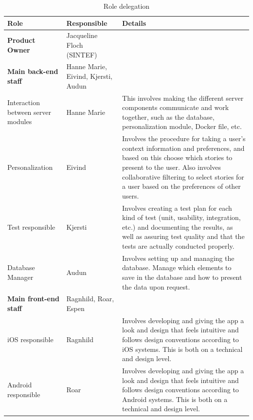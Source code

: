 \begin{table}[!h]
	\small
	\centering
		\caption{Role delegation}
		\begin{tabular}{ | p{3.7cm} | p{2.8cm} | p{10.5cm} |}
			\hline
			\textbf{Role} & \textbf{Responsible} & \textbf{Details} \\ \hline
			
			\textbf{Product Owner} & Jacqueline Floch (SINTEF) & \\ \hline
			
			\textbf{Main back-end staff} & Hanne Marie, Eivind, Kjersti, Audun & \\ \hline
			
			Interaction between server modules & Hanne Marie & This involves making the different server components communicate and work together, such as the database, personalization module, Docker file, etc. \\ \hline
			
			Personalization & Eivind & Involves the procedure for taking a user's context information and preferences, and based on this choose which stories to present to the user. Also involves collaborative filtering to select stories for a user based on the preferences of other users. \\ \hline
			
			Test responsible & Kjersti & Involves creating a test plan for each kind of test (unit, usability, integration, etc.) and documenting the results, as well as assuring test quality and that the tests are actually conducted properly. \\ \hline
			
			Database Manager & Audun & Involves setting up and managing the database. Manage which elements to save in the database and how to present the data upon request. \\ \hline
			
			\textbf{Main front-end staff} & Ragnhild, Roar, Espen & \\ \hline
			
			iOS responsible & Ragnhild & Involves developing and giving the app a look and design that feels intuitive and follows design conventions according to iOS systems. This is both on a technical and design level. \\ \hline
			
			Android responsible & Roar & Involves developing and giving the app a look and design that feels intuitive and follows design conventions according to Android systems. This is both on a  technical and design level. \\ \hline
			

\end{tabular}
\end{table}
